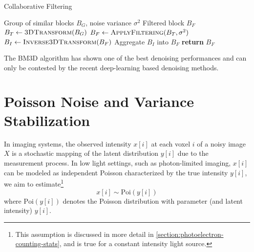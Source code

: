 \begin{algorithm}
    \caption{Collaborative Filtering}\label{alg:collaborativefiltering}
    \begin{algorithmic}[1]
    \Require Group of similar blocks $B_{G}$, noise variance $\sigma^2$
    \Ensure Filtered block $B_{F}$
        \State $B_{T} \gets \textsc{3DTransform}(B_{G})$
        \State $B_{F} \gets \textsc{ApplyFiltering}(B_{T}, \sigma^2)$
        \State $B_{I} \gets \textsc{Inverse3DTransform}(B_{F})$
        \State Aggregate $B_{I}$ into $B_{F}$
        \State \textbf{return} $B_{F}$
    \EndProcedure
    \end{algorithmic}
\end{algorithm}

The \gls{BM3D} algorithm has shown one of the best denoising performances and can only be contested by the recent deep-learning based denoising methods. 

\section{Poisson Noise and Variance Stabilization}\label{sec:poisson-noise-model}
In imaging systems, the observed intensity $x[i]$ at each voxel $i$ of a noisy image $X$ is a stochastic mapping of the latent distribution $y[i]$ due to the measurement process. In low light settings, such as photon-limited imaging, $x[i]$ can be modeled as independent Poisson characterized by the true intensity $y[i]$, we aim to estimate\footnote{This assumption is discussed in more detail in \cref{section:photoelectron-counting-stats}, and is true for a constant intensity light source.} \cite{makitaloOptimalInversionAnscombe2011,kimDeepLearningbasedStatistical2021} 
\begin{equation*}
    x[i] \sim \text{Poi}(y[i])
\end{equation*}
where $\text{Poi}(y[i])$ denotes the Poisson distribution with parameter (and latent intensity) $y[i]$. 

